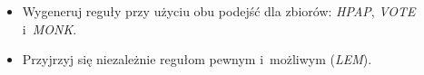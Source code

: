 \documentclass{article}
\begin{document}
\begin{itemize}
\item Wygeneruj reguły przy użyciu obu podejść dla zbiorów: \emph{HPAP}, \emph{VOTE} i~\emph{MONK}.
\item Przyjrzyj się niezależnie regułom pewnym i~możliwym (\emph{LEM}).
\end{itemize}





\end{document}
